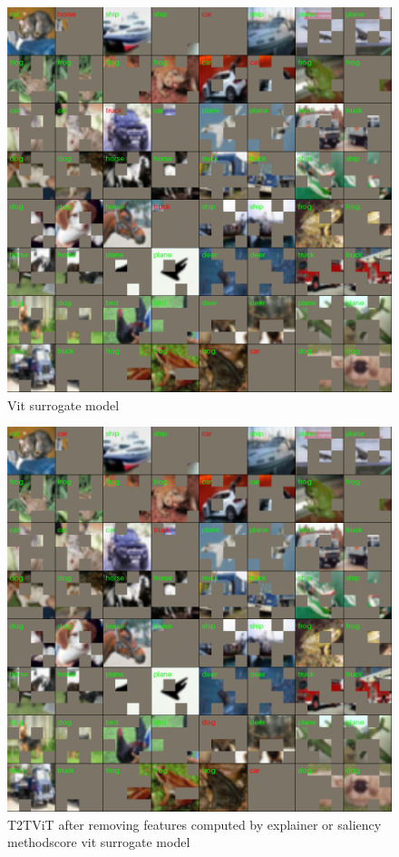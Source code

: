 \documentclass[magisterska,en]{pracamgr}
\begin{document}
\begin{figure}[H]
\centering
\includegraphics[scale=0.5]{./images/vit_surrogate_masks.png}
\caption{Vit surrogate model}
\label{vit_surrogate_masks}
\end{figure}


\begin{figure}[H]
\centering
\includegraphics[scale=0.5]{./images/t2t_vit_surrogate_masks.png}
\caption{T2T\textunderscore ViT after removing features computed by explainer or saliency methodscore vit surrogate model}
\label{t2t_vit_surrogate_masks}
\end{figure}
\end{document}
